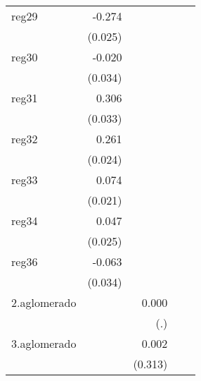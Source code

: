 {\begin{longtable}{l*{4}{D{.}{.}{-1}}}
\addlinespace
reg29       &      -0.274\sym{***}&                     &                     &                     \\
            &     (0.025)         &                     &                     &                     \\
\addlinespace
reg30       &      -0.020         &                     &                     &                     \\
            &     (0.034)         &                     &                     &                     \\
\addlinespace
reg31       &       0.306\sym{***}&                     &                     &                     \\
            &     (0.033)         &                     &                     &                     \\
\addlinespace
reg32       &       0.261\sym{***}&                     &                     &                     \\
            &     (0.024)         &                     &                     &                     \\
\addlinespace
reg33       &       0.074\sym{***}&                     &                     &                     \\
            &     (0.021)         &                     &                     &                     \\
\addlinespace
reg34       &       0.047         &                     &                     &                     \\
            &     (0.025)         &                     &                     &                     \\
\addlinespace
reg36       &      -0.063         &                     &                     &                     \\
            &     (0.034)         &                     &                     &                     \\
\addlinespace
2.aglomerado&                     &       0.000         &                     &                     \\
            &                     &         (.)         &                     &                     \\
\addlinespace
3.aglomerado&                     &       0.002         &                     &                     \\
            &                     &     (0.313)         &                     &                     \\

\end{longtable}}
